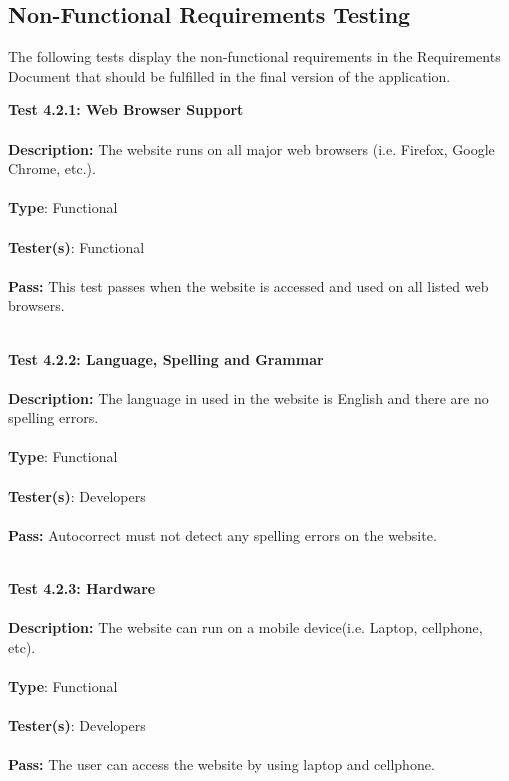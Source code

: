 \documentclass[12pt]{article}
\begin{document}
\subsection{Non-Functional Requirements Testing}
The following tests display the non-functional requirements in the Requirements Document that should be fulfilled in the final version of the application. 

\begin{tcolorbox}
\textbf{Test 4.2.1: Web Browser Support} \\ \\
\textbf{Description:} The website runs on all major web browsers (i.e. Firefox, Google Chrome, etc.). \\ \\
\textbf{Type}: Functional \\ \\
\textbf{Tester(s)}: Functional \\ \\
\textbf{Pass:} This test passes when the website is accessed and used on all listed web browsers. \\ \\
\end{tcolorbox}

\begin{tcolorbox}
\textbf{Test 4.2.2: Language, Spelling and Grammar} \\ \\
\textbf{Description:} The language in used in the website is English and there are no spelling errors. \\ \\
\textbf{Type}: Functional \\ \\
\textbf{Tester(s)}: Developers \\ \\
\textbf{Pass:} Autocorrect must not detect any spelling errors on the website. \\ \\
\end{tcolorbox}

\begin{tcolorbox}
\textbf{Test 4.2.3: Hardware} \\ \\
\textbf{Description:} The website can run on a mobile device(i.e. Laptop, cellphone, etc). \\ \\
\textbf{Type}: Functional \\ \\
\textbf{Tester(s)}: Developers \\ \\
\textbf{Pass:} The user can access the website by using laptop and cellphone. \\ \\
\end{tcolorbox}
\end{document}

